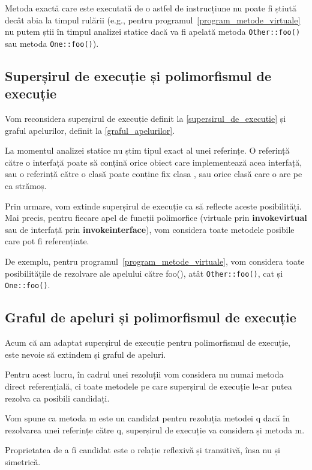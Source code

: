 Metoda exactă care este executată de o astfel de instrucțiune nu poate fi știută
decât abia la timpul rulării (e.g., pentru programul~\ref{program_metode_virtuale}
nu putem știi în timpul analizei statice dacă va fi apelată metoda
\texttt{Other::foo()} sau metoda \texttt{One::foo()}).

\subsection{Superșirul de execuție și polimorfismul de execuție}

Vom reconsidera superșirul de execuție definit la \ref{supersirul_de_executie}
și graful apelurilor, definit la \ref{graful_apelurilor}.

La momentul analizei statice nu știm tipul exact al unei referințe.
O referință către o interfață poate să conțină orice obiect care implementează
acea interfață, sau o referință către o clasă  poate conține fix clasa
, sau orice clasă care o are pe  ca strămoș.

Prin urmare, vom extinde superșirul de execuție ca să reflecte aceste
posibilități.
Mai precis, pentru fiecare apel de funcții polimorfice (virtuale prin
\textbf{invokevirtual} sau de interfață prin \textbf{invokeinterface}), vom
considera toate metodele posibile care pot fi referențiate.

De exemplu, pentru programul~\ref{program_metode_virtuale}, vom considera toate
posibilitățile de rezolvare ale apelului către foo(), atât \texttt{Other::foo()},
cat și \texttt{One::foo()}.

\subsection{Graful de apeluri și polimorfismul de execuție}

Acum că am adaptat superșirul de execuție pentru polimorfismul de execuție, este
nevoie să extindem și graful de apeluri.

Pentru acest lucru, în cadrul unei rezoluții vom considera nu numai metoda
direct referențială, ci toate metodele pe care superșirul de execuție le-ar
putea rezolva ca posibili candidați.

Vom spune ca metoda m este un candidat pentru rezoluția metodei q dacă în
rezolvarea unei referințe către q, superșirul de execuție va considera și metoda
m.

Proprietatea de a fi candidat este o relație reflexivă și tranzitivă, însa nu și
simetrică.

